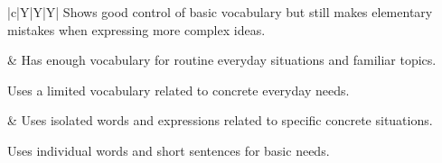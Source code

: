 \documentclass[a4paper,11pt]{article}
\begin{document}
\begin{center}
\begin{tabularx}{\textwidth}{|c|Y|Y|Y|}
    Shows good control of basic vocabulary but still makes elementary mistakes when expressing
    more complex ideas.
    
    &
    Has enough vocabulary for routine everyday situations and familiar topics.
    
    Uses a limited vocabulary related to concrete everyday needs.
    
    &
    Uses isolated words and expressions related to specific concrete situations.
    
    Uses individual words and short sentences for basic needs.
    
    \\
    \hline
            \end{tabularx}
        \end{center}
\end{document}
